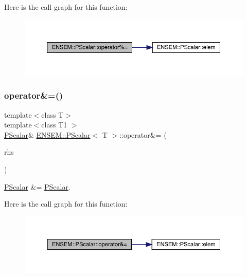 Here is the call graph for this function\+:
\nopagebreak
\begin{figure}[H]
\begin{center}
\leavevmode
\includegraphics[width=350pt]{d3/d27/classENSEM_1_1PScalar_ab583ff2667eba7d2bed2acbd3c15e43e_cgraph}
\end{center}
\end{figure}
\mbox{\label{classENSEM_1_1PScalar_a9c683c36c7129b6b016af09f8d5cda42}} 
\subsubsection{\texorpdfstring{operator\&=()}{operator\&=()}\hspace{0.1cm}{\footnotesize\ttfamily [1/2]}}
{\footnotesize\ttfamily template$<$class T$>$ \\
template$<$class T1 $>$ \\
\mbox{\hyperlink{classENSEM_1_1PScalar}{P\+Scalar}}\& \mbox{\hyperlink{classENSEM_1_1PScalar}{E\+N\+S\+E\+M\+::\+P\+Scalar}}$<$ T $>$\+::operator\&= (\begin{DoxyParamCaption}\item[{const \mbox{\hyperlink{classENSEM_1_1PScalar}{P\+Scalar}}$<$ T1 $>$ \&}]{rhs }\end{DoxyParamCaption})\hspace{0.3cm}{\ttfamily [inline]}}



\mbox{\hyperlink{classENSEM_1_1PScalar}{P\+Scalar}} \&= \mbox{\hyperlink{classENSEM_1_1PScalar}{P\+Scalar}}. 

Here is the call graph for this function\+:
\nopagebreak
\begin{figure}[H]
\begin{center}
\leavevmode
\includegraphics[width=350pt]{d3/d27/classENSEM_1_1PScalar_a9c683c36c7129b6b016af09f8d5cda42_cgraph}
\end{center}
\end{figure}
\mbox{\label{classENSEM_1_1PScalar_a9c683c36c7129b6b016af09f8d5cda42}} 
